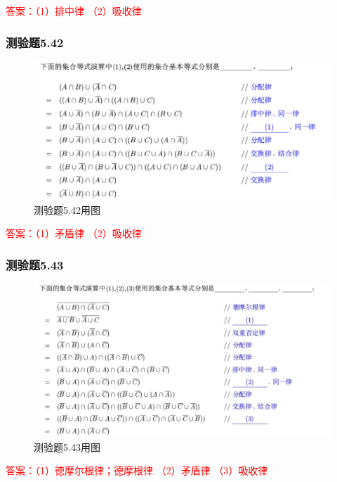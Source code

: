 \documentclass[UTF8, heading=true]{ctexart}
\begin{document}
\textcolor{red}{答案：（1）排中律 （2）吸收律}

\subsubsection{测验题5.42}

\begin{figure}[htbp]
  \centering
  \includegraphics[width=1\textwidth]{5.42.jpg} %
  \caption{测验题5.42用图}
\end{figure}
\textcolor{red}
{
  答案：（1）矛盾律
  （2）吸收律
}


\subsubsection{测验题5.43}
\begin{figure}[htbp]
  \centering
  \includegraphics[width=1\textwidth]{5.43.jpg} %
  \caption{测验题5.43用图}
\end{figure}
\textcolor{red}
{
  答案：（1）徳摩尔根律；德摩根律
  （2）矛盾律
  （3）吸收律
}
\end{document}
